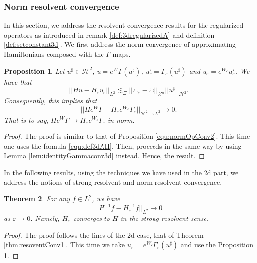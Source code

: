 \documentclass[11pt, oneside]{article}   	%
\newtheorem{theorem}{Theorem}[section]
\newtheorem{proposition}[theorem]{Proposition}
\begin{document}
\subsubsection{Norm resolvent convergence}

In this section, we address the resolvent convergence results for the regularized operators as introduced in remark \ref{def:3dregularizedA} and definition \ref{def:setconstant3d}.  We first address the norm convergence of approximating Hamiltonians composed with the $\Gamma$-maps.  

\begin{proposition} \label{prop:opApp3d}
	Let  $u^\sharp \in \mathscr{H}^2$, $u  =e^{W} \Gamma(u^\sharp )$,  $u_\varepsilon^\flat  = \Gamma_\varepsilon(u^\sharp )$ and $u_\varepsilon  =e^{W_\varepsilon}u_\varepsilon^\flat$. We have that
	\begin{equation}\label{equ:normOpConv23d}
	|| Hu - H_\varepsilon u_\varepsilon ||_{L^2} \lesssim_{\Xi}   || \Xi_\varepsilon - \Xi||_{\mathscr{X}^\alpha} ||u^\sharp||_{\mathscr{H}^2}.
	\end{equation}
	Consequently, this implies that
	\begin{equation} \label{equ:normOpConv33d}
	|| He^W \Gamma - H_\varepsilon e^{W_\varepsilon} \Gamma_\varepsilon   ||_{\mathscr{H}^2 \rightarrow L^2}  \rightarrow 0.
	\end{equation}
	That is to say, $He^W \Gamma \rightarrow H_\varepsilon e^{W_\varepsilon} \Gamma_\varepsilon$ in norm.
\end{proposition}



\begin{proof}
The proof is similar to that of Proposition \ref{equ:normOpConv2}.  This time one uses the formula \eqref{equ:def3dAH}.  Then, proceeds in the same way  by using  Lemma \ref{lem:identityGammaconv3d} instead. Hence, the result.
\end{proof}

In the following results, using the techniques we have used in the 2d part, we address the notions of strong  resolvent  and norm resolvent convergence.

	\begin{theorem} \label{thm:resoventConv13d}
	For any $f \in L^2$, we have
	\[
	|| H^{-1} f - H_\varepsilon^{-1} f||_{L^2} \rightarrow 0
	\]
	as $\varepsilon \rightarrow 0$. Namely, $H_\varepsilon $ converges to $H$ in the strong  resolvent sense.
\end{theorem}
\begin{proof}
The proof follows the lines of the 2d case, that of Theorem \ref{thm:resoventConv1}. This time we take $u_\varepsilon = e^{W_\varepsilon}\Gamma_\varepsilon (u^\sharp)$ and use the Proposition \ref{prop:opApp3d}.
\end{proof}
\end{document}
